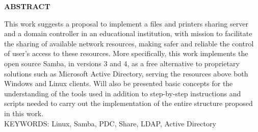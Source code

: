 \begin{center}
\textbf{ABSTRACT}
\end{center}

\singlespacing

\noindent This work suggests a proposal to implement a files and printers sharing server and a domain controller in an educational institution, with mission to facilitate the sharing of available network
resources, making safer and reliable the control of user’s access to these resources. More specifically, this work implements the open source Samba, in versions 3 and 4, as a free alternative to 
proprietary solutions such as Microsoft Active Directory, serving the resources above both Windows and Linux clients. Will also be presented basic concepts for the understanding of the tools 
used in addition to step-by-step instructions and scripts needed to carry out the implementation of the entire structure proposed in this work.\\

\noindent KEYWORDS: Linux, Samba, PDC, Share, LDAP, Active Directory